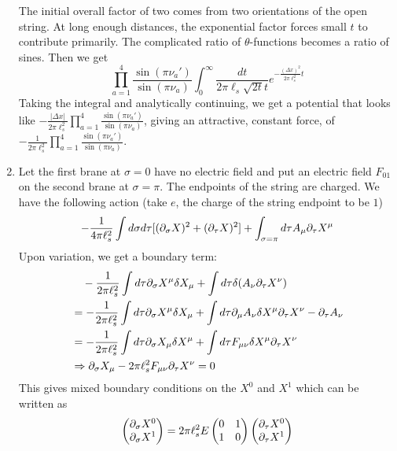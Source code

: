 \documentclass[11pt, class=article, crop=false]{standalone}
\begin{document}
\begin{enumerate}
\begin{equation}
	\end{equation}
	The initial overall factor of two comes from two orientations of the open string.
	At long enough distances, the exponential factor forces small $t$ to contribute primarily. The complicated ratio of $\theta$-functions becomes a ratio of sines. Then we get
	\[
		\prod_{a=1}^4 \frac{\sin(\pi \nu_a')}{\sin(\pi \nu_a)} \int_0^\infty \frac{dt}{2 \pi \ell_s \sqrt{2 t} t} e^{- \frac{(\Delta x)^2}{2\pi \ell_s^2} t}
	\]
	Taking the integral and analytically continuing, we get a potential that looks like $- \frac{|\Delta x|}{2 \pi \ell_s^2} \prod_{a=1}^4 \frac{\sin(\pi \nu_a')}{\sin(\pi \nu_a)}$, giving an attractive, constant force, of $-\frac{1}{2 \pi \ell_s^2} \prod_{a=1}^4 \frac{\sin(\pi \nu_a')}{\sin(\pi \nu_a)}$.
	
	\item Let the first brane at $\sigma = 0$ have no electric field and put an electric field $F_{01}$ on the second brane at $\sigma = \pi$. The endpoints of the string are charged. We have the following action (take $e$, the charge of the string endpoint to be $1$)
	\[
		-\frac{1}{4\pi \ell_s^2} \int d\sigma d\tau [(\partial_\sigma X)^2 + (\partial_\tau X)^2] + \int_{\sigma = \pi} d\tau A_\mu \partial_{\tau} X^\mu
	\]
	Upon variation, we get a boundary term:
	\[
	\begin{aligned}
		&\quad -\frac{1}{2\pi \ell_s^2} \int d\tau \partial_\sigma X^\mu \delta X_\mu  + \int d\tau \delta(A_\nu \partial_\tau X^\nu)
		\\
		&= -\frac{1}{2\pi \ell_s^2} \int d\tau \partial_\sigma X^\mu \delta X_\mu  + \int d\tau \partial_\mu A_\nu \delta X^\mu \partial_\tau X^\nu - \partial_\tau A_\nu \\
		&= -\frac{1}{2\pi \ell_s^2} \int d\tau \partial_\sigma X_\mu \delta X^\mu  + \int d\tau F_{\mu \nu} \delta X^\mu \partial_\tau X^\nu\\
		& \Rightarrow \partial_\sigma X_\mu - 2\pi \ell_s^2 F_{\mu \nu} \partial_\tau X^\nu = 0
	\end{aligned}
	\]
	This gives mixed boundary conditions on the $X^0$ and $X^1$ which can be written as
	\[
		\begin{pmatrix}
			\partial_\sigma X^0\\
			\partial_\sigma X^1
		\end{pmatrix}= 2 \pi \ell_s^2 E \begin{pmatrix}
			0 & 1 \\
			1 & 0
		\end{pmatrix}
		\begin{pmatrix}
			\partial_\tau X^0\\
			\partial_\tau X^1

\end{pmatrix}\]
\end{enumerate}
\end{document}
